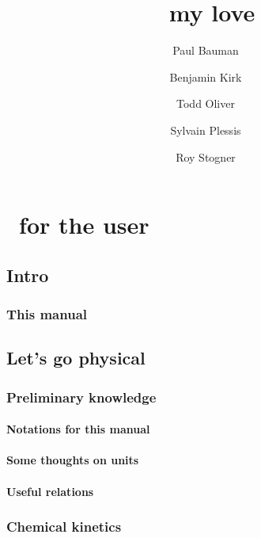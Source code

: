 \documentclass[twoside]{report}
\begin{document}
\title{\Antioch\ my love}
\date{\theversion}
\author{Paul Bauman \and Benjamin Kirk \and Todd Oliver \and Sylvain Plessis \and Roy Stogner}

\maketitle
\tableofcontents

\part{\Antioch\ for the user}

\chapter{Intro}

\section{This manual}


\chapter{Let's go physical}
\chaptermark{\ANTIOCHPhys}
\label{Antioch:physics}

\section{Preliminary knowledge}

\subsection{Notations for this manual}


\subsection{Some thoughts on units}
\label{units_in_Antioch}


\subsection{Useful relations}
\label{relations}


\section{Chemical kinetics}
\end{document}
